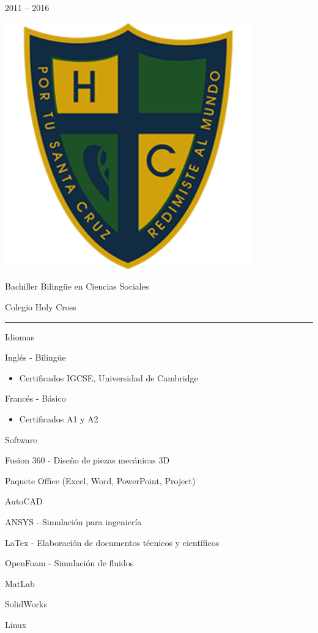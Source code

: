 \documentclass[a4paper,10pt]{article}
\newlength{\cvcolumngapwidth}
\newlength{\cvleftcolumnwidth}
\newlength{\cvrightcolumnwidth}
\newcommand{\cvsectionstyle}[1]{{\normalsize\cvsectionfont\textcolor{cvsectioncolor}{#1}}}
\newcommand{\cvtitlestyle}[1]{{\large\cvtitlefont\textcolor{cvtitlecolor}{#1}}}
\newcommand{\cvdurationstyle}[1]{{\small\cvdurationfont\textcolor{cvdurationcolor}{#1}}}
\newcommand{\cvheadingstyle}[1]{{\normalsize\cvheadingfont\textcolor{cvheadingcolor}{#1}}}
\newlength{\cvafteritemskipamount}
\newlength{\cvaftersectionskipamount}
\newlength{\cvbetweensectionandheadingextraskipamount}
\newlength{\cvaftertitleskipamount}
\newlength{\cvparskip}
\newcommand{\cvsection}[1]{
    \begin{minipage}[t]{\cvleftcolumnwidth}
        \raggedleft\cvsectionstyle{#1}
    \end{minipage}%
    \hspace{\cvcolumngapwidth}%
    \begin{minipage}[t]{\cvrightcolumnwidth}
        \textcolor{cvrulecolor}{\rule{\cvrightcolumnwidth}{0.3mm}}
    \end{minipage}

    \vspace{\cvaftersectionskipamount}
}
\newcommand{\cvitem}[2]{
    \begin{minipage}[t]{\cvleftcolumnwidth}
        \raggedleft #1
    \end{minipage}%
    \hspace{\cvcolumngapwidth}%
    \begin{minipage}[t]{\cvrightcolumnwidth}
        \setlength{\parskip}{\cvparskip} #2
    \end{minipage}

    \vspace{\cvafteritemskipamount}
}
\newcommand{\cvtitle}[1]{
    \cvtitlestyle{#1}

    \vspace{\cvaftertitleskipamount}
    \vspace{-\cvparskip}
}
\begin{document}
\cvitem{
    \cvdurationstyle{2011 -- 2016}
}{
    \begin{minipage}{0.1\textwidth}
        \centering
        \includegraphics[width=0.8\textwidth]{../logos-photos/Logo_HC.png}   
    \end{minipage}  
    \cvtitle{Bachiller Bilingüe en Ciencias Sociales}

    Colegio Holy Cross
}


\newpage
\cvsection{HABILIDADES}

\vspace{\cvbetweensectionandheadingextraskipamount}

\cvitem{
    \cvheadingstyle{Idiomas}
}{
    Inglés - Bilingüe
    \begin{itemize}
        \item Certificados IGCSE, Universidad de Cambridge
    \end{itemize}

    Francés - Básico
    \begin{itemize}
        \item Certificados A1 y A2
    \end{itemize}
}

\cvitem{
    \cvheadingstyle{Software}
}{
    Fusion 360 - Diseño de piezas mecánicas 3D
    
    Paquete Office (Excel, Word, PowerPoint, Project)

    AutoCAD
    
    ANSYS - Simulación para ingeniería
    
    LaTex - Elaboración de documentos técnicos y científicos
    
    OpenFoam - Simulación de fluidos

    MatLab

    SolidWorks

    Linux
}
\end{document}
